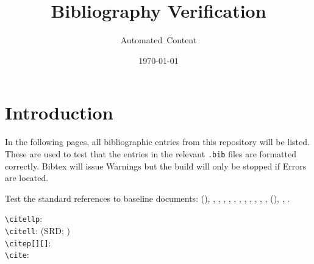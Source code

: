 \documentclass[DM,toc]{lsstdoc}
\title[Bib testing]{Bibliography Verification}
\author{Automated~Content}
\date{\today}
\begin{document}
\maketitle

\section{Introduction}

In the following pages, all bibliographic entries from this repository will be listed.
These are used to test that the entries in the relevant \texttt{.bib} files are formatted correctly.
Bibtex will issue Warnings but the build will only be stopped if Errors are located.

Test the standard references to baseline documents: (\SRD), \DPDD, \LSR, \OSS, \DMSR, \appsUMLdomain, \appsUMLusecase, \SUI, \DMSD, \MOPSD, \DMMD, \DMOps, (\SDQAP), \NewPCP, \UCAL.

\verb|\citellp|:  \\
\verb|\citell|: (SRD; ) \\
\verb|\citep[][]|: \citep[e.g.,][are interesting]{LPM-17,LSE-29} \\
\verb|\cite|: \cite{LPM-17,LSE-29}

\nocite{*}



\end{document}
